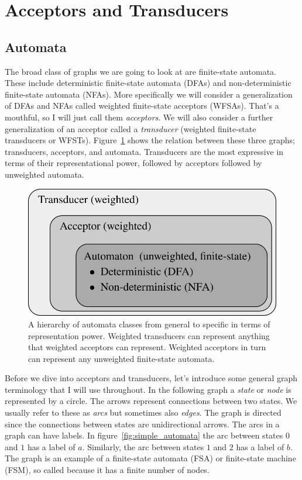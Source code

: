 \documentclass[main.tex]{subfiles}
\begin{document}
\section{Acceptors and Transducers}
\label{sec:acceptors_transducers}

\subsection{Automata}
\label{sec:automata}

The broad class of graphs we are going to look at are finite-state automata.
These include deterministic finite-state automata (DFAs) and non-deterministic
finite-state automata (NFAs). More specifically we will consider a
generalization of DFAs and NFAs called weighted finite-state acceptors (WFSAs).
That's a mouthful, so I will just call them \emph{acceptors}. We will also
consider a further generalization of an acceptor called a \emph{transducer}
(weighted finite-state transducers or WFSTs). Figure~\ref{fig:wfsa_classes}
shows the relation between these three graphs; transducers, acceptors, and
automata. Transducers are the most expressive in terms of their
representational power, followed by acceptors followed by unweighted automata.

\begin{figure}
    \centering
    \includegraphics[width=0.7\linewidth]{figures/wfsa_classes}
    \caption{A hierarchy of automata classes from general to specific in terms
    of representation power. Weighted transducers can represent anything that
    weighted acceptors can represent. Weighted acceptors in turn can represent
    any unweighted finite-state automata.}
    \label{fig:wfsa_classes}
\end{figure}

Before we dive into acceptors and transducers, let's introduce some general
graph terminology that I will use throughout. In the following graph a
\emph{state} or \emph{node} is represented by a circle. The arrows represent
connections between two states. We usually refer to these as \emph{arcs} but
sometimes also \emph{edges}. The graph is directed since the connections
between states are unidirectional arrows. The arcs in a graph can have labels.
In figure~\ref{fig:simple_automata} the arc between states $0$ and $1$ has a
label of $a$. Similarly, the arc between states $1$ and $2$ has a label of $b$.
The graph is an example of a finite-state automata (FSA) or finite-state
machine (FSM), so called because it has a finite number of nodes.
\end{document}
